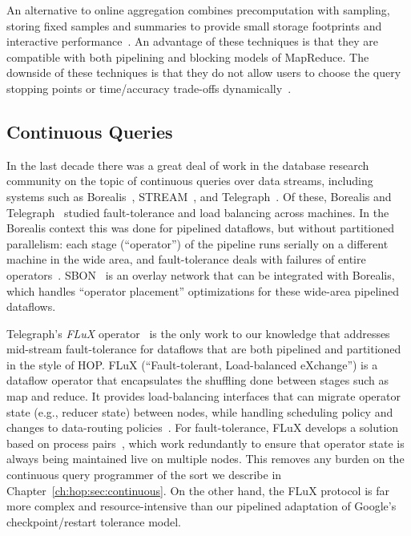 An alternative to online aggregation combines precomputation with sampling,
storing fixed samples and summaries to provide small storage footprints and
interactive performance~\cite{gibbons98new}.  An advantage of these techniques
is that they are compatible with both pipelining and blocking models of
MapReduce.  The downside of these techniques is that they do not allow users to
choose the query stopping points or time/accuracy trade-offs
dynamically~\cite{ieeecontrol}.

\subsection{Continuous Queries}

In the last decade there was a great deal of work in the database research
community on the topic of continuous queries over data streams, including
systems such as Borealis~\cite{borealis}, STREAM~\cite{stream}, and
Telegraph~\cite{tcq-cidr}.  Of these, Borealis and Telegraph~\cite{flux-ft}
studied fault-tolerance and load balancing across machines.  In the Borealis
context this was done for pipelined dataflows, but without partitioned
parallelism: each stage (``operator'') of the pipeline runs serially on a
different machine in the wide area, and fault-tolerance deals with failures of
entire operators~\cite{borealisFT}.  SBON~\cite{sbon} is an overlay network
that can be integrated with Borealis, which handles ``operator placement''
optimizations for these wide-area pipelined dataflows.

Telegraph's {\em FLuX} operator~\cite{flux-ft,flux-lb} is the only work to our
knowledge that addresses mid-stream fault-tolerance for dataflows that are both
pipelined and partitioned in the style of HOP\@.  FLuX (``Fault-tolerant,
Load-balanced eXchange'') is a dataflow operator that encapsulates the
shuffling done between stages such as map and reduce.  It provides
load-balancing interfaces that can migrate operator state (e.g., reducer state)
between nodes, while handling scheduling policy and changes to data-routing
policies~\cite{flux-lb}.  For fault-tolerance, FLuX develops a solution based
on process pairs~\cite{flux-ft}, which work redundantly to ensure that operator
state is always being maintained live on multiple nodes.  This removes any
burden on the continuous query programmer of the sort we describe in
Chapter~\ref{ch:hop:sec:continuous}.  On the other hand, the FLuX protocol is
far more complex and resource-intensive than our pipelined adaptation of
Google's checkpoint/restart tolerance model.

